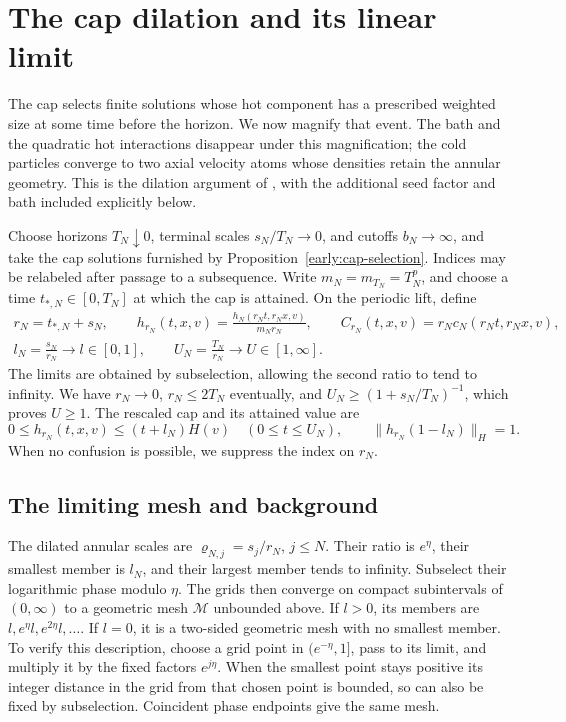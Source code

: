 \section{The cap dilation and its linear limit}\label{sec:dilation}

The cap selects finite solutions whose hot component has a prescribed
weighted size at some time before the horizon. We now magnify that event.
The bath and the quadratic hot interactions disappear under this
magnification; the cold particles converge to two axial velocity atoms
whose densities retain the annular geometry. This is the dilation
argument of \cite[Section~7]{OpenAIPeriodic}, with the additional seed
factor and bath included explicitly below.

Choose horizons \(T_N\downarrow0\), terminal scales
\(s_N/T_N\to0\), and cutoffs \(b_N\to\infty\), and take the cap
solutions furnished by Proposition~\ref{early:cap-selection}. Indices may be
relabeled after passage to a subsequence. Write
\(m_N=m_{T_N}=T_N^p\), and choose a time
\(t_{*,N}\in[0,T_N]\) at which the cap is attained. On the periodic
lift, define
\begin{equation}\label{eq:rescaling}
\begin{gathered}
r_N=t_{*,N}+s_N,\qquad
h_{r_N}(t,x,v)=\frac{h_N(r_Nt,r_Nx,v)}{m_Nr_N},\qquad
C_{r_N}(t,x,v)=r_Nc_N(r_Nt,r_Nx,v),\\
l_N=\frac{s_N}{r_N}\longrightarrow l\in[0,1],\qquad
U_N=\frac{T_N}{r_N}\longrightarrow U\in[1,\infty].
\end{gathered}
\end{equation}
The limits are obtained by subselection, allowing the second ratio to
tend to infinity. We have \(r_N\to0\), \(r_N\le2T_N\) eventually,
and
\(U_N\ge(1+s_N/T_N)^{-1}\), which proves \(U\ge1\).
The rescaled cap and its attained value are
\begin{equation}\label{dil:cap-bound}
0\le h_{r_N}(t,x,v)\le(t+l_N)H(v)\quad(0\le t\le U_N),
\qquad \|h_{r_N}(1-l_N)\|_H=1.
\end{equation}
When no confusion is possible, we suppress the index on \(r_N\).


\subsection{The limiting mesh and background}

The dilated annular scales are \(\varrho_{N,j}=s_j/r_N\), \(j\leq N\).
Their ratio is \(e^\eta\), their smallest member is \(l_N\), and
their largest member tends to infinity. Subselect their logarithmic
phase modulo \(\eta\). The grids then converge on compact
subintervals of \((0,\infty)\) to a geometric mesh \(\mathcal M\)
unbounded above. If \(l>0\), its members are
\(l,e^\eta l,e^{2\eta}l,\ldots\). If \(l=0\), it is a two-sided
geometric mesh with no smallest member. To verify this description,
choose a grid point in \((e^{-\eta},1]\), pass to its limit, and
multiply it by the fixed factors \(e^{j\eta}\). When the smallest
point stays positive its integer distance in the grid from that chosen
point is bounded, so can also be fixed by subselection. Coincident phase
endpoints give the same mesh.

